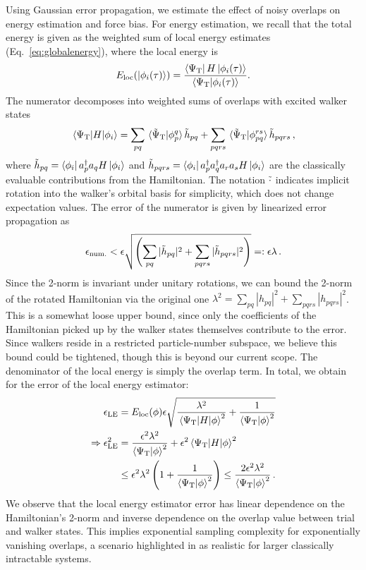 \documentclass[../main.tex]{subfiles}
\begin{document}
Using Gaussian error propagation, we estimate the effect of noisy overlaps on energy estimation and force bias. For energy estimation, we recall that the total energy is given as the weighted sum of local energy estimates (Eq.~\ref{eq:globalenergy}), where the local energy is
\begin{equation}
    E_{\mathrm{loc}} (\ket{\phi_i(\tau)}) = \frac{\bra{\Psi_\mathrm{T}} H \ket{\phi_i(\tau)}}{\braket{\Psi_\mathrm{T}}{\phi_i(\tau)}}. 
\end{equation} The numerator decomposes into weighted sums of overlaps with excited walker states
\begin{equation}
    \matrixel{\Psi_\mathrm{T}}{H}{\phi_i} = \sum_{pq} \braket*{\Tilde{\Psi}_\mathrm{T}}{\phi_{p}^{q}} \Tilde{h}_{pq}+\sum_{pqrs}\braket*{\Tilde{\Psi}_\mathrm{T}}{\phi_{pq}^{rs}} \Tilde{h}_{pqrs}\,,
\end{equation} where  $\Tilde{h}_{pq} = \bra{\phi_i} a_p^\dagger a_q H \ket{\phi_i}$ and $\Tilde{h}_{pqrs} = \bra{\phi_i} a_p^\dagger a_q^\dagger a_r a_s H \ket{\phi_i}$ are the classically evaluable contributions from the Hamiltonian. The notation $\Tilde{\cdot}$  indicates implicit rotation into the walker's orbital basis for simplicity, which does not change expectation values. The error of the numerator is given by linearized error propagation as 
\begin{align}
        \epsilon_\mathrm{num.}<\epsilon \sqrt{\left(\sum_{pq} |\Tilde{h}_{pq}|^2 + \sum_{pqrs} |\Tilde{h}_{pqrs}|^2\right)}=:\epsilon\lambda\,.
\end{align} Since the 2-norm is invariant under unitary rotations, we can bound the 2-norm of the rotated Hamiltonian via the original one $\lambda^2=\sum_{pq} |h_{pq}|^2 + \sum_{pqrs} |h_{pqrs}|^2$. This is a somewhat loose upper bound, since only the coefficients of the Hamiltonian picked up by the walker states themselves contribute to the error. Since walkers reside in a restricted particle-number subspace, we believe this bound could be tightened, though this is beyond our current scope.
The denominator of the local energy is simply the overlap term. In total, we obtain for the error of the local energy estimator:
\begin{align}
    \epsilon_\mathrm{LE} &= E_\mathrm{loc}(\phi)\epsilon\sqrt{\frac{\lambda^2}{\matrixel{\Psi_\mathrm{T}}{H}{\phi}^2}+\frac{1}{\braket{\Psi_\mathrm{T}}{\phi}^2}}\\
    \Rightarrow \epsilon_{\mathrm{LE}}^2 &= \frac{\epsilon^2\lambda^2}{\braket{\Psi_\mathrm{T}}{\phi}^2}+\epsilon^2 \matrixel{\Psi_\mathrm{T}}{H}{\phi}^2\\
    &\leq \epsilon^2\lambda^2 \left(1+\frac{1}{\braket{\Psi_\mathrm{T}}{\phi}^2}\right)\leq\frac{2 \epsilon^2\lambda^2}{\braket{\Psi_\mathrm{T}}{\phi}^2}\,.
\end{align} We observe that the local energy estimator error has linear dependence on the Hamiltonian's 2-norm and inverse dependence on the overlap value between trial and walker states. This implies exponential sampling complexity for exponentially vanishing overlaps, a scenario highlighted in \cite{mazzola2022exponential} as realistic for larger classically intractable systems.
\end{document}
